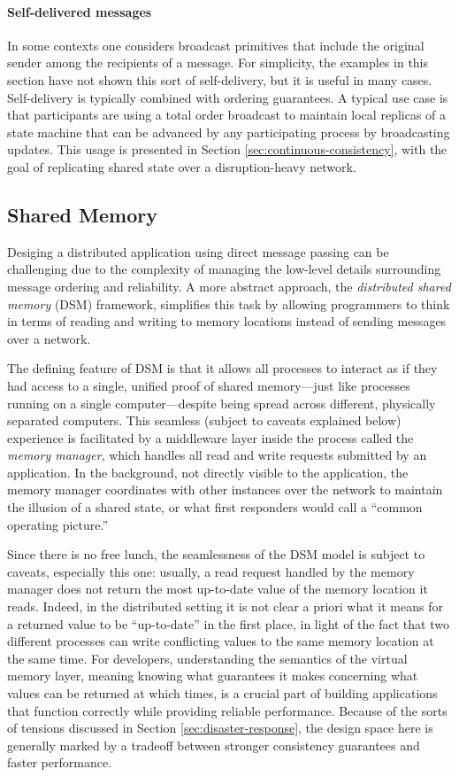 \documentclass[]             %
{NASA}                       %
\theoremstyle{definition}
\begin{document}
\paragraph{Self-delivered messages}
In some contexts one considers broadcast primitives that include the
original sender among the recipients of a message. For simplicity, the
examples in this section have not shown this sort of self-delivery,
but it is useful in many cases. Self-delivery is typically combined
with ordering guarantees. A typical use case is that participants are
using a total order broadcast to maintain local replicas of a state
machine that can be advanced by any participating process by
broadcasting updates.  This usage is presented in Section
\ref{sec:continuous-consistency}, with the goal of replicating shared
state over a disruption-heavy network.

\subsection{Shared Memory}
\label{ssec:shared-memory}
Desiging a distributed application using direct message passing can be
challenging due to the complexity of managing the low-level details
surrounding message ordering and reliability. A more abstract
approach, the \emph{distributed shared memory} (DSM) framework,
simplifies this task by allowing programmers to think in terms of
reading and writing to memory locations instead of sending messages
over a network.

The defining feature of DSM is that it allows all processes to
interact as if they had access to a single, unified proof of shared
memory---just like processes running on a single computer---despite
being spread across different, physically separated computers.  This
seamless (subject to caveats explained below) experience is
facilitated by a middleware layer inside the process called the
\emph{memory manager}, which handles all read and write requests
submitted by an application. In the background, not directly visible
to the application, the memory manager coordinates with other
instances over the network to maintain the illusion of a shared state,
or what first responders would call a ``common operating picture.''

Since there is no free lunch, the seamlessness of the DSM model is
subject to caveats, especially this one: usually, a read request
handled by the memory manager does not return the most up-to-date
value of the memory location it reads. Indeed, in the distributed
setting it is not clear a priori what it means for a returned value to
be ``up-to-date'' in the first place, in light of the fact that two
different processes can write conflicting values to the same memory
location at the same time. For developers, understanding the semantics
of the virtual memory layer, meaning knowing what guarantees it makes
concerning what values can be returned at which times, is a crucial
part of building applications that function correctly while providing
reliable performance. Because of the sorts of tensions discussed in
Section \ref{sec:disaster-response}, the design space here is
generally marked by a tradeoff between stronger consistency guarantees
and faster performance.
\end{document}
